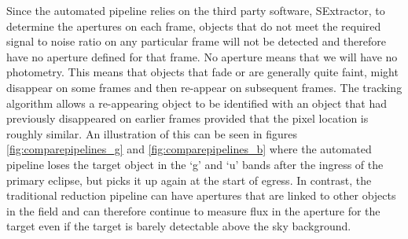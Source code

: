Since the automated pipeline relies on the third party software, SExtractor, to determine the apertures on each frame, objects that do not meet the required signal to noise ratio on any particular frame will not be detected and therefore have no aperture defined for that frame. No aperture means that we will have no photometry. This means that objects that fade or are generally quite faint, might disappear on some frames and then re-appear on subsequent frames. The tracking algorithm allows a re-appearing object to be identified with an object that had previously disappeared on earlier frames provided that the pixel location is roughly similar. An illustration of this can be seen in figures \ref{fig:comparepipelines_g} and \ref{fig:comparepipelines_b} where the automated pipeline loses the target object in the `g' and `u' bands after the ingress of the primary eclipse, but picks it up again at the start of egress. In contrast, the traditional reduction pipeline can have apertures that are linked to other objects in the field and can therefore continue to measure flux in the aperture for the target even if the target is barely detectable above the sky background.



